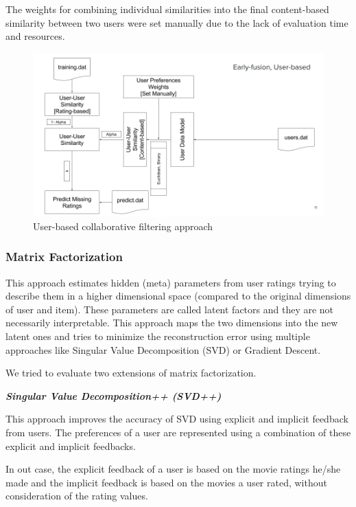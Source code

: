 \documentclass{sigish}
\begin{document}
The weights for combining individual similarities into the final content-based similarity between two users were set manually due to the lack of evaluation time and resources.

\begin{figure}
	\centering
	\includegraphics[width=\columnwidth]{images/ubcf_approach.png}
	\caption{User-based collaborative filtering approach}
	\label{fig:ubcf_approach}
\end{figure}

\subsubsection{Matrix Factorization}

This approach estimates hidden (meta) parameters from user ratings trying to describe them in a higher dimensional space (compared to the original dimensions of user and item). These parameters are called latent factors and they are not necessarily interpretable. This approach maps the two dimensions into the new latent ones and tries to minimize the reconstruction error using multiple approaches like Singular Value Decomposition (SVD) or Gradient Descent.

We tried to evaluate two extensions of matrix factorization.

\textbf{\emph{Singular Value Decomposition++ (SVD++) }}

This approach improves the accuracy of SVD using explicit and implicit feedback from users. The preferences of a user are represented using a combination of these explicit and implicit feedbacks.

In out case, the explicit feedback of a user is based on the movie ratings he/she made and the implicit feedback is based on the movies a user rated, without consideration of the rating values.
\end{document}
